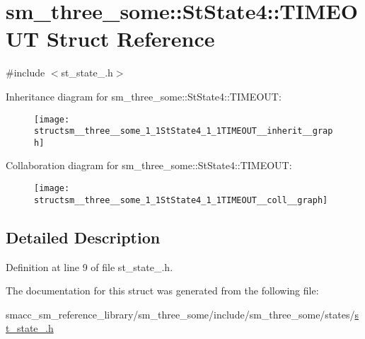 \hypertarget{structsm__three__some_1_1StState4_1_1TIMEOUT}{}\section{sm\+\_\+three\+\_\+some\+:\+:St\+State4\+:\+:T\+I\+M\+E\+O\+UT Struct Reference}
\label{structsm__three__some_1_1StState4_1_1TIMEOUT}


{\ttfamily \#include $<$st\+\_\+state\+\_.\+h$>$}



Inheritance diagram for sm\+\_\+three\+\_\+some\+:\+:St\+State4\+:\+:T\+I\+M\+E\+O\+UT\+:
\nopagebreak
\begin{figure}[H]
\begin{center}
\leavevmode
\texttt{[image: structsm\_\_three\_\_some\_1\_1StState4\_1\_1TIMEOUT\_\_inherit\_\_graph]}
\end{center}
\end{figure}


Collaboration diagram for sm\+\_\+three\+\_\+some\+:\+:St\+State4\+:\+:T\+I\+M\+E\+O\+UT\+:
\nopagebreak
\begin{figure}[H]
\begin{center}
\leavevmode
\texttt{[image: structsm\_\_three\_\_some\_1\_1StState4\_1\_1TIMEOUT\_\_coll\_\_graph]}
\end{center}
\end{figure}


\subsection{Detailed Description}


Definition at line 9 of file st\+\_\+state\+\_.\+h.



The documentation for this struct was generated from the following file\+:\begin{DoxyCompactItemize}
\item 
smacc\+\_\+sm\+\_\+reference\+\_\+library/sm\+\_\+three\+\_\+some/include/sm\+\_\+three\+\_\+some/states/\hyperlink{st__state__4_8h}{st\+\_\+state\+\_.\+h}\end{DoxyCompactItemize}
